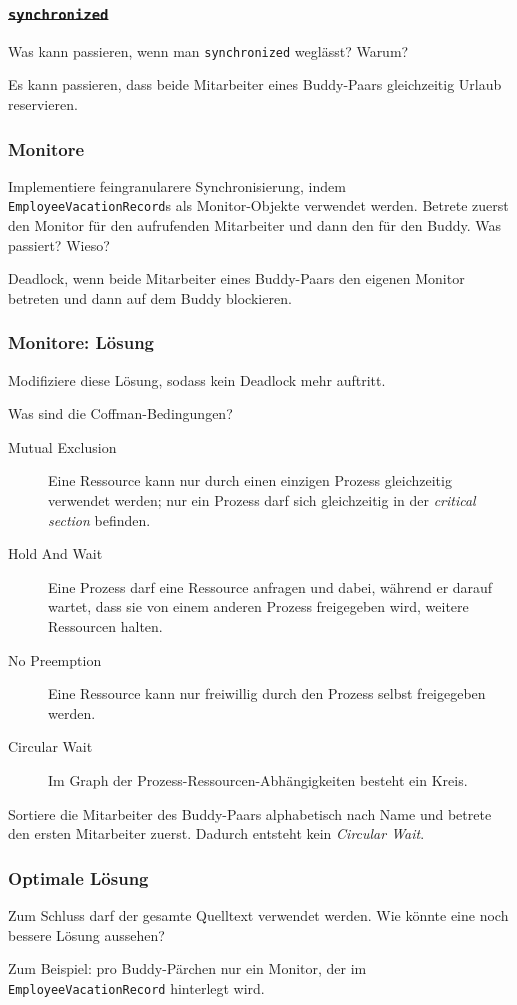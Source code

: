 \documentclass{beamer}
\begin{document}
\begin{frame}
  \frametitle{\sout{\lstinline{synchronized}}}
  Was kann passieren, wenn man \lstinline{synchronized} weglässt? Warum?
  
  \pause
  Es kann passieren, dass beide Mitarbeiter eines Buddy-Paars gleichzeitig Urlaub reservieren.
\end{frame}

\begin{frame}
  \frametitle{Monitore}
  Implementiere feingranularere Synchronisierung, indem \lstinline{EmployeeVacationRecord}s als Monitor-Objekte verwendet werden.
  Betrete zuerst den Monitor für den aufrufenden Mitarbeiter und dann den für den Buddy.
  Was passiert? Wieso?
  
  \pause
  Deadlock, wenn beide Mitarbeiter eines Buddy-Paars den eigenen Monitor betreten und dann auf dem Buddy blockieren.
\end{frame}

\begin{frame}
  \frametitle{Monitore: Lösung}
  Modifiziere diese Lösung, sodass kein Deadlock mehr auftritt.
  
  Was sind die Coffman-Bedingungen?
  \pause
  \begin{description}
  \item[Mutual Exclusion]
    Eine Ressource kann nur durch einen einzigen Prozess gleichzeitig verwendet werden;
    nur ein Prozess darf sich gleichzeitig in der \emph{critical section} befinden.
  \item[Hold And Wait]
    Eine Prozess darf eine Ressource anfragen und dabei, während er darauf wartet, dass sie von einem anderen Prozess freigegeben wird, weitere Ressourcen halten.
  \item[No Preemption]
    Eine Ressource kann nur freiwillig durch den Prozess selbst freigegeben werden.
  \item[Circular Wait]
    Im Graph der Prozess-Ressourcen-Abhängigkeiten besteht ein Kreis.
  \end{description}
  
  \pause
  Sortiere die Mitarbeiter des Buddy-Paars alphabetisch nach Name
  und betrete den ersten Mitarbeiter zuerst.
  Dadurch entsteht kein \emph{Circular Wait}.
\end{frame}

\begin{frame}
  \frametitle{Optimale Lösung}
  Zum Schluss darf der gesamte Quelltext verwendet werden.
  Wie könnte eine noch bessere Lösung aussehen?
  
  \pause
  Zum Beispiel: pro Buddy-Pärchen nur ein Monitor,
  der im \lstinline{EmployeeVacationRecord} hinterlegt wird.
\end{frame}
\end{document}
